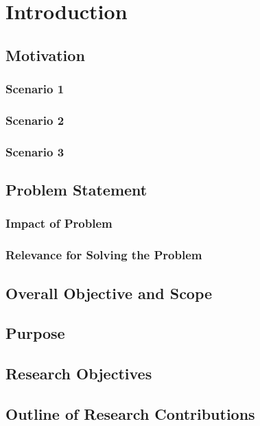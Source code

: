 \chapter{Introduction}
\label{chap:introduction}


\section{Motivation}

\subsection{Scenario 1}


\subsection{Scenario 2}

\subsection{Scenario 3}


\section{Problem Statement}


\subsection{Impact of Problem}


\subsection{Relevance for Solving the Problem}


\section{Overall Objective and Scope}


\section{Purpose}


\section{Research Objectives}


\section{Outline of Research Contributions}